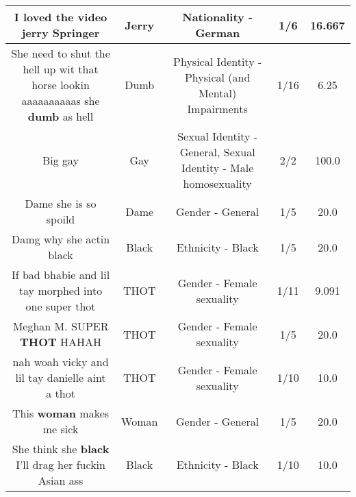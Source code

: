 \documentclass[11pt]{article}
\newlength\mylength
\begin{document}
\begin{center}
\begin{longtable}{|C{.65\mylength}|C{.30\mylength}|C{.12\mylength}|C{.12\mylength}|C{.12\mylength}|}
  \small I loved the video \textbf{jerry} Springer\normalsize   & Jerry & Nationality - German & 1/6 & 16.667 \\  \hline
  \small She need to shut the hell up wit that horse lookin aaaaaaaaaas she \textbf{dumb} as hell\normalsize   & Dumb & Physical Identity - Physical (and Mental) Impairments & 1/16 & 6.25 \\  \hline
  \small Big gay\normalsize   & Gay & Sexual Identity - General, Sexual Identity - Male homosexuality & 2/2 & 100.0 \\  \hline
  \small Dame she is so spoild\normalsize   & Dame & Gender - General & 1/5 & 20.0 \\  \hline
  \small Damg why she actin black\normalsize   & Black & Ethnicity - Black & 1/5 & 20.0 \\  \hline
  \small If bad bhabie and lil tay morphed into one super thot\normalsize   & THOT & Gender - Female sexuality & 1/11 & 9.091 \\  \hline
  \small Meghan M. SUPER \textbf{THOT} HAHAH\normalsize   & THOT & Gender - Female sexuality & 1/5 & 20.0 \\  \hline
  \small nah woah vicky and lil tay danielle aint a thot\normalsize   & THOT & Gender - Female sexuality & 1/10 & 10.0 \\  \hline
  \small This \textbf{woman} makes me sick\normalsize   & Woman & Gender - General & 1/5 & 20.0 \\  \hline
  \small She think she \textbf{black} I'll drag her fuckin Asian ass\normalsize   & Black & Ethnicity - Black & 1/10 & 10.0 \\  \hline

\end{longtable}
\end{center}
\end{document}
